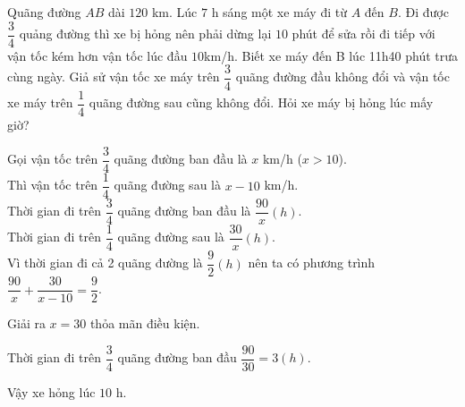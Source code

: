 \begin{ex}%
Quãng đường $AB$ dài $120$ km. Lúc $7$ h sáng một xe máy đi từ $A$ đến $B$. Đi được $\dfrac{3}{4}$ quảng đường thì xe bị hỏng nên phải dừng lại $10$ phút để sửa  rồi đi tiếp với vận tốc kém hơn vận tốc lúc đầu $10$km/h. Biết xe máy đến B lúc 11h40 phút trưa cùng ngày. Giả sử vận tốc xe máy  trên $\dfrac{3}{4}$ quãng đường đầu không đổi và vận tốc xe máy  trên $\dfrac{1}{4}$ quãng đường sau cũng không đổi. Hỏi xe máy bị hỏng lúc mấy giờ?
\loigiai
    {
    Gọi vận tốc  trên $\dfrac{3}{4}$ quãng đường ban đầu là $x$ km/h ($x>10$).\\
    Thì vận tốc trên  $\dfrac{1}{4}$ quãng đường sau là $x-10$ km/h. \\
    Thời gian đi trên  $\dfrac{3}{4}$ quãng đường ban đầu  là $\dfrac{90}{x}(h)$.\\
    Thời gian đi trên  $\dfrac{1}{4}$ quãng đường sau là  $\dfrac{30}{x}(h)$.\\
    Vì thời gian đi cả 2 quãng đường là $\dfrac{9}{2}(h)$ nên ta có phương trình $\dfrac{90}{x}+\dfrac{30}{x-10}=\dfrac{9}{2}$.

    Giải  ra $x=30$ thỏa mãn điều kiện.

     Thời gian đi trên  $\dfrac{3}{4}$ quãng đường ban đầu $\dfrac{90}{30}=3(h)$.

    Vậy xe hỏng lúc $10$ h.
    }
\end{ex}

